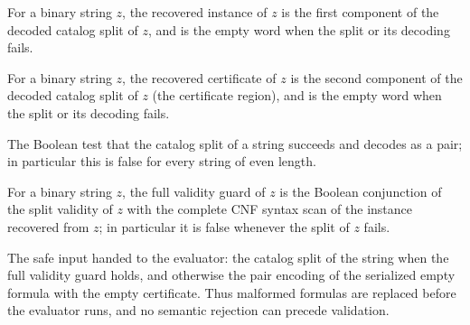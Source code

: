 \begin{definition}
\label{Complexity.satInstance}
\leanok
{}
For a binary string $z$, the recovered instance of $z$ is the first component of
the decoded catalog split of $z$, and is the empty word when the split or its
decoding fails.
\end{definition}

\begin{definition}
\label{Complexity.satWitness}
\leanok
{}
For a binary string $z$, the recovered certificate of $z$ is the second component
of the decoded catalog split of $z$ (the certificate region), and is the empty
word when the split or its decoding fails.
\end{definition}

\begin{definition}
\label{Complexity.satSplitValid}
\leanok
{}
The Boolean test that the catalog split of a string succeeds and decodes as a pair;
in particular this is false for every string of even length.
\end{definition}

\begin{definition}
\label{Complexity.satGood}
\leanok
{}
For a binary string $z$, the full validity guard of $z$ is the Boolean
conjunction of the split validity of $z$ with the complete CNF syntax scan of the
instance recovered from $z$; in particular it is false whenever the split of $z$
fails.
\end{definition}

\begin{definition}
\label{Complexity.satSafe}
\leanok
{}
The safe input handed to the evaluator: the catalog split of the string when the
full validity guard holds, and otherwise the pair encoding of the serialized empty
formula with the empty certificate. Thus malformed formulas are replaced before the
evaluator runs, and no semantic rejection can precede validation.
\end{definition}

